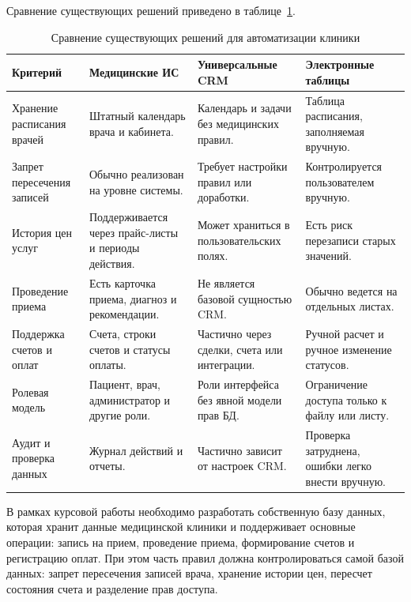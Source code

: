 Сравнение существующих решений приведено в таблице~\ref{tab:solutions}.

\begin{table}[ht]
    \centering
    \caption{Сравнение существующих решений для автоматизации клиники}
    \label{tab:solutions}
    \scriptsize
    \renewcommand{\arraystretch}{1.08}
    \begin{tabularx}{\textwidth}{|>{\raggedright\arraybackslash}p{3.2cm}|>{\raggedright\arraybackslash}X|>{\raggedright\arraybackslash}X|>{\raggedright\arraybackslash}X|}
        \hline
        Критерий & Медицинские ИС & Универсальные CRM & Электронные таблицы \\
        \hline
        Хранение расписания врачей & Штатный календарь врача и кабинета. & Календарь и задачи без медицинских правил. & Таблица расписания, заполняемая вручную. \tabularnewline
        \hline
        Запрет пересечения записей & Обычно реализован на уровне системы. & Требует настройки правил или доработки. & Контролируется пользователем вручную. \tabularnewline
        \hline
        История цен услуг & Поддерживается через прайс-листы и периоды действия. & Может храниться в пользовательских полях. & Есть риск перезаписи старых значений. \tabularnewline
        \hline
        Проведение приема & Есть карточка приема, диагноз и рекомендации. & Не является базовой сущностью CRM. & Обычно ведется на отдельных листах. \tabularnewline
        \hline
        Поддержка счетов и оплат & Счета, строки счетов и статусы оплаты. & Частично через сделки, счета или интеграции. & Ручной расчет и ручное изменение статусов. \tabularnewline
        \hline
        Ролевая модель & Пациент, врач, администратор и другие роли. & Роли интерфейса без явной модели прав БД. & Ограничение доступа только к файлу или листу. \tabularnewline
        \hline
        Аудит и проверка данных & Журнал действий и отчеты. & Частично зависит от настроек CRM. & Проверка затруднена, ошибки легко внести вручную. \tabularnewline
        \hline
    \end{tabularx}
\end{table}
\normalsize

В рамках курсовой работы необходимо разработать собственную базу данных, которая хранит данные медицинской клиники и поддерживает основные операции: запись на прием, проведение приема, формирование счетов и регистрацию оплат. При этом часть правил должна контролироваться самой базой данных: запрет пересечения записей врача, хранение истории цен, пересчет состояния счета и разделение прав доступа.

